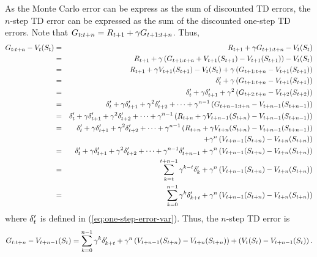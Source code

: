 As the Monte Carlo error can be express as the sum of discounted TD errors,
the $n$-step TD error can be expressed as the sum of the discounted one-step TD errors.
Note that $G_{{t}:{t+n}} = R_{t+1} + \gamma G_{{t+1}:{t+n}}$. Thus,
\begin{eqnarray*}
G_{{t}:{t+n}} - V_t(S_{t})
&=& R_{t+1} + \gamma G_{{t+1}:{t+n}} - V_t(S_{t})
\\
&=& R_{t+1} + \gamma \left( G_{{t+1}:{t+n}} + V_{t+1}(S_{t+1}) - V_{t+1}(S_{t+1}) \right)- V_t(S_{t})
\\
&=& R_{t+1} + \gamma V_{t+1}(S_{t+1}) - V_t(S_{t})
+ \gamma \left( G_{{t+1}:{t+n}} - V_{t+1}(S_{t+1}) \right)
\\
&=& \delta'_{t} + \gamma \left( G_{{t+1}:{t+n}} - V_{t+1}(S_{t+1}) \right)
\\
&=& \delta'_{t} + \gamma \delta'_{t+1} + \gamma^2 \left( G_{{t+2}:{t+n}} - V_{t+2}(S_{t+2}) \right)
\\
&=& \delta'_{t} + \gamma \delta'_{t+1} + \gamma^2 \delta'_{t+2} + \cdots
+ \gamma^{n-1} \left( G_{{t+n-1}:{t+n}} - V_{t+n-1}(S_{t+n-1}) \right)
\\
&=& \delta'_{t} + \gamma \delta'_{t+1} + \gamma^2 \delta'_{t+2} + \cdots
+ \gamma^{n-1} \left( R_{t+n} + \gamma V_{t+n-1}(S_{t+n}) - V_{t+n-1}(S_{t+n-1}) \right)
\\
&=& \delta'_{t} + \gamma \delta'_{t+1} + \gamma^2 \delta'_{t+2} + \cdots
+ \gamma^{n-1} \left( R_{t+n} + \gamma V_{t+n}(S_{t+n}) - V_{t+n-1}(S_{t+n-1}) \right)
\\
&& + \gamma^{n} \left( V_{t+n-1}(S_{t+n}) - V_{t+n}(S_{t+n}) \right)
\\
&=& \delta'_{t} + \gamma \delta'_{t+1} + \gamma^2 \delta'_{t+2} + \cdots + \gamma^{n-1} \delta'_{t+n-1}
+ \gamma^{n} \left( V_{t+n-1}(S_{t+n}) - V_{t+n}(S_{t+n}) \right)
\\
&=& \sum_{k=t}^{t+n-1} \gamma^{k-t}\delta'_{k} + \gamma^{n} \left( V_{t+n-1}(S_{t+n}) - V_{t+n}(S_{t+n}) \right)
\\
&=& \sum_{k=0}^{n-1} \gamma^{k}\delta'_{k+t} + \gamma^{n} \left( V_{t+n-1}(S_{t+n}) - V_{t+n}(S_{t+n}) \right)
\end{eqnarray*}
where $\delta'_{t}$ is defined in (\ref{eq:one-step-error-var}).
Thus, the $n$-step TD error is
\begin{equation}
G_{{t}:{t+n}} - V_{t+n-1}(S_{t})
= \sum_{k=0}^{n-1} \gamma^{k}\delta'_{k+t}
+ \gamma^{n} \left( V_{t+n-1}(S_{t+n}) - V_{t+n}(S_{t+n}) \right)
+ \left(V_t(S_{t}) - V_{t+n-1}(S_{t})\right).
\end{equation}

